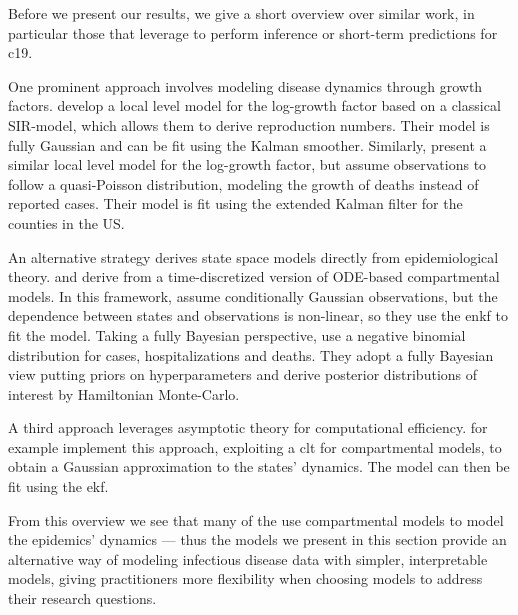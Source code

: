 Before we present our results, we give a short overview over similar work, in particular those that leverage  to perform inference or short-term predictions for \acrshort{c19}. 

One prominent approach involves modeling disease dynamics through growth factors. \citep{Arroyo-Marioli2021Tracking} develop a local level model for the log-growth factor based on a classical SIR-model, which allows them to derive reproduction numbers. Their model is fully Gaussian and can be fit using the Kalman smoother. Similarly, \citep{Ives2021Estimating} present a similar local level model for the log-growth factor, but assume observations to follow a quasi-Poisson distribution, modeling the growth of deaths instead of reported cases. Their model is fit using the extended Kalman filter for the counties in the US.

An alternative strategy derives state space models directly from epidemiological theory. \citep{Lal2021Application} and \citep{Keller2022Tracking} derive  from a time-discretized version of ODE-based compartmental models. In this framework, \citep{Lal2021Application} assume conditionally Gaussian observations, but the dependence between states and observations is non-linear, so they use the \acrshort{enkf} to fit the model. Taking a fully Bayesian perspective, \citep{Keller2022Tracking} use a negative binomial distribution for cases, hospitalizations and deaths. They adopt a fully Bayesian view putting priors on hyperparameters and derive posterior distributions of interest by Hamiltonian Monte-Carlo.

A third approach leverages asymptotic theory for computational efficiency. \citep{ODea2022Semiparametric} for example implement this approach, exploiting a \acrshort{clt} for compartmental models, to obtain a Gaussian approximation to the states' dynamics. The model can then be fit using the \acrshort{ekf}.

From this overview we see that many of the  use compartmental models to model the epidemics' dynamics --- thus the models we present in this section provide an alternative way of modeling infectious disease data with simpler, interpretable models, giving practitioners more flexibility when choosing models to address their research questions.



